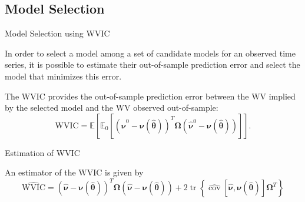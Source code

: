 \documentclass[envcountsect,usenames,dvipsnames]{beamer}
\DeclareMathOperator*{\cov}{cov}
\DeclareMathOperator*{\tr}{tr}
\theoremstyle{mystyle}
\begin{document}
\subsection{Model Selection}
\begin{frame}{Model Selection using WVIC}

In order to select a model among a set of candidate models for an observed time series, it is possible to estimate their out-of-sample prediction error and select the model that minimizes this error. 

\begin{Definition}

The WVIC provides the out-of-sample prediction error between the WV implied by the selected model and the WV observed out-of-sample:
%
\begin{equation*}
    		\text{WVIC} = \mathbb{E} \left[ \mathbb{E}_0 \left[  \left(\hat{\bm{\nu}}^0 - \bm{\nu}(\hat{\bm{\theta}})\right)^{T} {\bm{\Omega}} \left(\hat{\bm{\nu}}^0 - \bm{\nu}(\hat{\bm{\theta}})\right)
		\right] \right].
\end{equation*}

\end{Definition}

\begin{block}{Estimation of WVIC}

An estimator of the WVIC is given by
\begin{equation*}
		\widehat{\text{WVIC}} =  \left( \hat{\bm{\nu}} - \bm{\nu} ( \hat{\bm{\theta}})\right)^T \bm{\Omega} \left( \hat{\bm{\nu}} - \bm{\nu} ( \hat{\bm{\theta}})\right)
		+ 2 \tr \left\{ \widehat{\cov} \left[ \hat{\bm{\nu}} ,  \bm{\nu}( \hat{\bm{\theta}}) \right] \bm{\Omega}^T\right\}
\end{equation*}

\end{block}
    
\end{frame}
\end{document}
